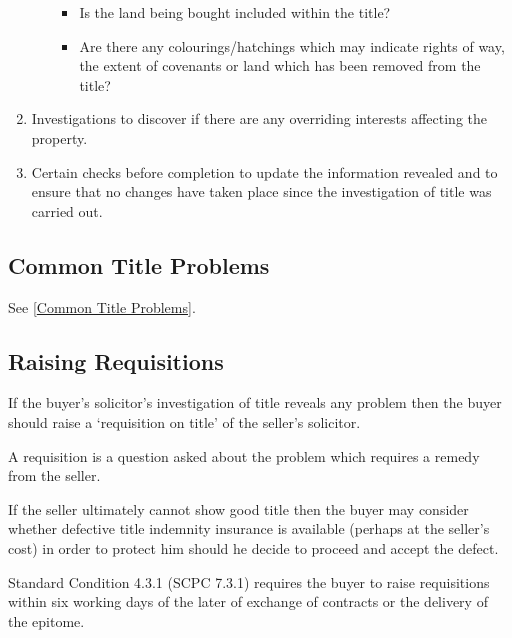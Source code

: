 \documentclass[
]{article}
\newenvironment{Shaded}{}{}
\newcommand{\NormalTok}[1]{#1}
\providecommand{\tightlist}{%
  \setlength{\itemsep}{0pt}\setlength{\parskip}{0pt}}
\begin{document}
\begin{enumerate}
\begin{itemize}
    \begin{itemize}
    \tightlist
    \item
      Is the land being bought included within the title?
    \item
      Are there any colourings/hatchings which may indicate rights of
      way, the extent of covenants or land which has been removed from
      the title?
    \end{itemize}
  \end{itemize}
\item
  Investigations to discover if there are any overriding interests
  affecting the property.
\item
  Certain checks before completion to update the information revealed
  and to ensure that no changes have taken place since the investigation
  of title was carried out.
\end{enumerate}

\hypertarget{common-title-problems}{%
\subsection{Common Title Problems}\label{common-title-problems}}

See {[}\protect\hyperlink{common-title-problems-1}{Common Title
Problems}{]}.

\hypertarget{raising-requisitions}{%
\subsection{Raising Requisitions}\label{raising-requisitions}}

If the buyer's solicitor's investigation of title reveals any problem
then the buyer should raise a `requisition on title' of the seller's
solicitor.

\begin{Shaded}
\begin{Highlighting}[]
\NormalTok{A requisition is a question asked about the problem which requires a remedy from the seller.}
\end{Highlighting}
\end{Shaded}

If the seller ultimately cannot show good title then the buyer may
consider whether defective title indemnity insurance is available
(perhaps at the seller's cost) in order to protect him should he decide
to proceed and accept the defect.

Standard Condition 4.3.1 (SCPC 7.3.1) requires the buyer to raise
requisitions within six working days of the later of exchange of
contracts or the delivery of the epitome.
\end{document}
